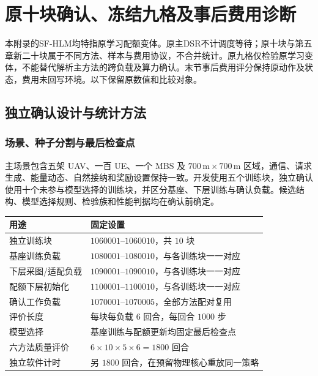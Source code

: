 \chapter{原十块确认、冻结九格及事后费用诊断}
\label{app:legacy-results}
本附录的SF-HLM均特指原学习配额变体。原主DSR不计调度等待；原十块与第五章新二十块属于不同方法、样本与费用协议，不合并统计。原九格仅检验原学习变体，不能替代解析主方法的跨负载及算力确认。末节事后费用评分保持原动作及状态，费用未回写环境。以下保留原数值和比较对象。

\section{独立确认设计与统计方法}
\label{legacy:sec:whole-protocol}
\label{legacy:sec:ch5-protocol}

\subsection{场景、种子分割与最后检查点}

主场景包含五架 UAV、一百 UE、一个 MBS 及 $700\,\mathrm{m}\times700\,\mathrm{m}$ 区域，通信、请求生成、能量动态、自然接纳和奖励设置保持一致。开发使用五个训练块，独立确认使用十个未参与模型选择的训练块，并区分基座、下层训练与确认负载。候选结构、模型选择规则、检验族和性能判据均在确认前确定。

\begin{table}[!htbp]
 \centering
 \label{legacy:tab:ch5-seeds}
 \begin{tabular}{lp{}}
  \toprule
  用途 & 固定设置 \\
  \midrule
  独立训练块 & $1060001$--$1060010$，共 $10$ 块 \\
  基座训练负载 & $1080001$--$1080010$，与各训练块一一对应 \\
  下层采图/适配负载 & $1090001$--$1090010$，与各训练块一一对应 \\
  配额下层初始化 & $1100001$--$1100010$，与各训练块一一对应 \\
  确认工作负载 & $1070001$--$1070005$，全部方法配对复用 \\
  评价长度 & 每块每负载 $6$ 回合，每回合 $1000$ 步 \\
  模型选择 & 基座训练与配额更新均固定最后检查点 \\
  六方法质量评价 & $6\times10\times5\times6=1800$ 回合 \\
  独立软件计时 & 另 $1800$ 回合，在预留物理核心重放同一策略 \\
  \bottomrule
 \end{tabular}
\end{table}

